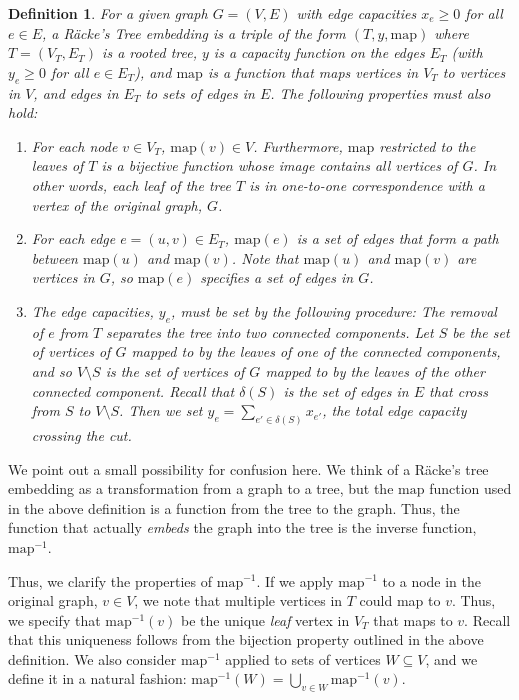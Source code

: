 \documentclass[12pt]{article}
\newtheorem{definition}{Definition}
\begin{document}
\begin{definition}
For a given graph $G = (V, E)$ with edge capacities $x_e \geq 0$ for all $e \in E$, a R\"{a}cke's Tree embedding is a triple of the form $(T,y,\mathrm{map})$ where $T = (V_T,E_T)$ is a rooted tree, $y$ is a capacity function on the edges $E_T$ (with $y_e \geq 0$ for all $e \in E_T$), and $\mathrm{map}$ is a function that maps vertices in $V_T$ to vertices in $V$, and edges in $E_T$ to sets of edges in $E$. The following properties must also hold:
\begin{enumerate}
\item For each node $v \in V_T$, $\mathrm{map}(v) \in V$. Furthermore, $\mathrm{map}$ restricted to the leaves of $T$ is a bijective function whose image contains all vertices of $G$. In other words, each leaf of the tree $T$ is in one-to-one correspondence with a vertex of the original graph, $G$.
\item For each edge $e = (u,v) \in E_T$, $\mathrm{map}(e)$ is a set of edges that form a path between $\mathrm{map}(u)$ and $\mathrm{map}(v)$. Note that $\mathrm{map}(u)$ and $\mathrm{map}(v)$ are vertices in $G$, so $\mathrm{map}(e)$ specifies a set of edges in $G$.
\item The edge capacities, $y_e$, must be set by the following procedure: The removal of $e$ from $T$ separates the tree into two connected components. Let $S$ be the set of vertices of $G$ mapped to by the leaves of one of the connected components, and so $V \setminus S$ is the set of vertices of $G$ mapped to by the leaves of the other connected component. Recall that $\delta(S)$ is the set of edges in $E$ that cross from $S$ to $V \setminus S$. Then we set $y_e = \sum_{e' \in \delta(S)} x_{e'}$, the total edge capacity crossing the cut.
\end{enumerate}
\end{definition}

We point out a small possibility for confusion here. We think of a R\"{a}cke's tree embedding as a transformation from a graph to a tree, but the $\mathrm{map}$ function used in the above definition is a function from the tree to the graph. Thus, the function that actually \emph{embeds} the graph into the tree is the inverse function, $\mathrm{map}^{-1}$.

Thus, we clarify the properties of $\mathrm{map}^{-1}$. If we apply $\mathrm{map}^{-1}$ to a node in the original graph, $v \in V$, we note that multiple vertices in $T$ could map to $v$. Thus, we specify that $\mathrm{map}^{-1}(v)$ be the unique \emph{leaf} vertex in $V_T$ that maps to $v$. Recall that this uniqueness follows from the bijection property outlined in the above definition. We also consider $\mathrm{map}^{-1}$ applied to sets of vertices $W \subseteq V$, and we define it in a natural fashion: $\mathrm{map}^{-1}(W) = \bigcup_{v \in W} \mathrm{map}^{-1}(v)$.
\end{document}
